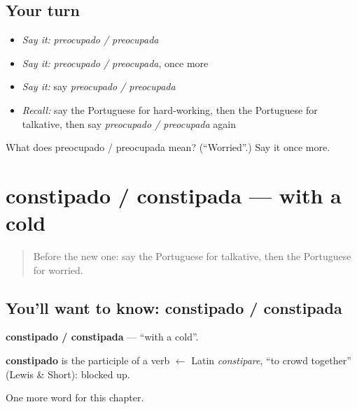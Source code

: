 \subsection*{Your turn}
\begin{itemize}
\raggedright
  \item \emph{Say it:} \emph{preocupado / preocupada}
  \item \emph{Say it:} \emph{preocupado / preocupada}, once more
  \item \emph{Say it:} say \emph{preocupado / preocupada}
  \item \emph{Recall:} say the Portuguese for hard-working, then the Portuguese for talkative, then say \emph{preocupado / preocupada} again
\end{itemize}

\begin{tcolorbox}[breakable,colback=teal!4,colframe=teal!35!black,title={Before you move on}]
What does preocupado / preocupada mean? (\textquotedblleft{}Worried\textquotedblright{}.) Say it once more.
\end{tcolorbox}
\section[constipado / constipada]{constipado / constipada — with a cold}

\label{lesson:PT-C187-constipado-constipada}



\begin{quote}
Before the new one: say the Portuguese for talkative, then the Portuguese for worried.
\end{quote}

\subsection*{You'll want to know: constipado / constipada}
\textbf{constipado / constipada} — \textquotedblleft{}with a cold\textquotedblright{}.

\begin{cousinweb}
\textbf{constipado} is the participle of a verb $\leftarrow$ Latin \emph{constipare}, \textquotedblleft{}to crowd together\textquotedblright{} (Lewis \& Short): blocked up.
\end{cousinweb}

\begin{grammarlens}[title={What you've built}]
One more word for this chapter.
\end{grammarlens}

